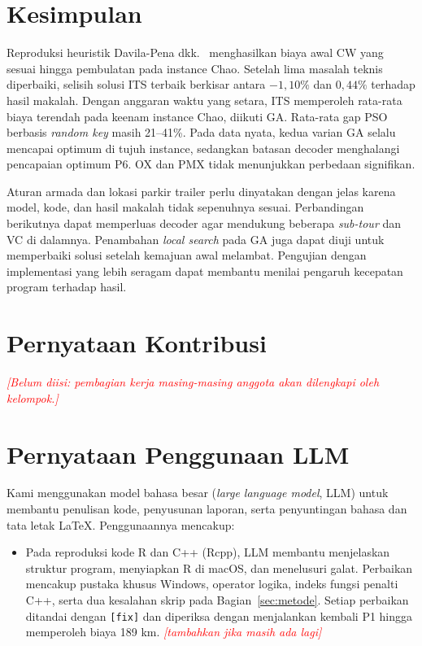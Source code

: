 \documentclass[conference]{IEEEtran}
\begin{document}
\balance
\section{Kesimpulan}

Reproduksi heuristik Davila-Pena dkk.\ \cite{davila2023} menghasilkan biaya awal CW yang sesuai hingga pembulatan pada instance Chao. Setelah lima masalah teknis diperbaiki, selisih solusi ITS terbaik berkisar antara $-1{,}10\%$ dan $0{,}44\%$ terhadap hasil makalah. Dengan anggaran waktu yang setara, ITS memperoleh rata-rata biaya terendah pada keenam instance Chao, diikuti GA. Rata-rata gap PSO berbasis \textit{random key} masih 21--41\%. Pada data nyata, kedua varian GA selalu mencapai optimum di tujuh instance, sedangkan batasan decoder menghalangi pencapaian optimum P6. OX dan PMX tidak menunjukkan perbedaan signifikan.

Aturan armada dan lokasi parkir trailer perlu dinyatakan dengan jelas karena model, kode, dan hasil makalah tidak sepenuhnya sesuai. Perbandingan berikutnya dapat memperluas decoder agar mendukung beberapa \textit{sub-tour} dan VC di dalamnya. Penambahan \textit{local search} pada GA juga dapat diuji untuk memperbaiki solusi setelah kemajuan awal melambat. Pengujian dengan implementasi yang lebih seragam dapat membantu menilai pengaruh kecepatan program terhadap hasil.

\section*{Pernyataan Kontribusi}

\textcolor{red}{\textit{[Belum diisi: pembagian kerja masing-masing anggota akan dilengkapi oleh kelompok.]}}

\section*{Pernyataan Penggunaan LLM}

Kami menggunakan model bahasa besar (\textit{large language model}, LLM) untuk membantu penulisan kode, penyusunan laporan, serta penyuntingan bahasa dan tata letak LaTeX. Penggunaannya mencakup:
\begin{itemize}
\item Pada reproduksi kode R dan C++ (Rcpp), LLM membantu menjelaskan struktur program, menyiapkan R di macOS, dan menelusuri galat. Perbaikan mencakup pustaka khusus Windows, operator logika, indeks fungsi penalti C++, serta dua kesalahan skrip pada Bagian~\ref{sec:metode}. Setiap perbaikan ditandai dengan \texttt{[fix]} dan diperiksa dengan menjalankan kembali P1 hingga memperoleh biaya 189 km.
\textcolor{red}{\textit{[tambahkan jika masih ada lagi]}}
\end{itemize}
\end{document}
